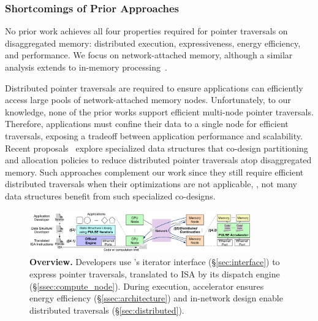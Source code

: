 \subsubsection{Shortcomings of Prior Approaches}
\label{ssec:prior}



No prior work achieves all four properties required for pointer traversals on disaggregated memory: distributed execution, expressiveness, energy efficiency, and performance. We focus on network-attached memory, although a similar analysis extends to in-memory processing~\cite{walkers, ahn2015scalable, impica, asghari2016chameleon, chi2016prime, seshadri2017simple, dai2018graphh, schuiki2018scalable, mutlu2019processing, kwon2019_TensorDIMM, boroumand2019_codna, gu2020ipim, lockerman2020livia, cho2020_data, ke2020_RecNMP, wang2021stream, xie2021spacea, ke2021near, singh2021fpga, olgun2022pidram, mutlu2022modern, oliveira2022accelerating, eckert2022eidetic, tu2022redcim, dai2022dimmining, devic2022_PIM, wang2022_Nearstream, gomez2023evaluating, xie2023mpu}.
 

 Distributed pointer traversals are required to ensure applications can efficiently access large pools of network-attached memory nodes. Unfortunately, to our knowledge, none of the prior works support efficient multi-node pointer traversals. Therefore, applications must confine their data to a single node for efficient traversals, exposing a tradeoff between application performance and scalability. Recent proposals~\cite{sherman, clover, fusee, rolex, marlin, sephash, ditto} explore specialized data structures that co-design partitioning and allocation policies to reduce distributed pointer traversals atop disaggregated memory. Such approaches complement our work since they still require efficient distributed traversals when their optimizations are not applicable, \eg, not many data structures benefit from such specialized co-designs. 

\begin{figure}[ht!]
  \centering
  \includegraphics[width=0.85\textwidth]{fig/pulse/overview.pdf}
  \vspace{-1em}
  \caption[\pulse Overview]{\textbf{\pulse Overview.} Developers use \pulse's iterator interface (\S\ref{sec:interface}) to express pointer traversals, translated to \pulse ISA by its dispatch engine (\S\ref{ssec:compute_node}). During execution, \pulse accelerator ensures energy efficiency (\S\ref{ssec:architecture}) and in-network design enable distributed traversals (\S\ref{sec:distributed}).} 
  \label{fig:general}\vspace{-1em}
\end{figure}

